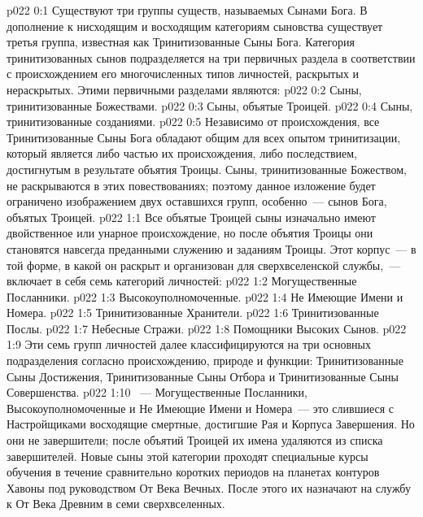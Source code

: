 \author{Могущественный Посланник}
\vs p022 0:1 Существуют три группы существ, называемых Сынами Бога. В дополнение к нисходящим и восходящим категориям сыновства существует третья группа, известная как Тринитизованные Сыны Бога. Категория тринитизованных сынов подразделяется на три первичных раздела в соответствии с происхождением его многочисленных типов личностей, раскрытых и нераскрытых. Этими первичными разделами являются:
\vs p022 0:2 Сыны, тринитизованные Божествами.
\vs p022 0:3 Сыны, объятые Троицей.
\vs p022 0:4 Сыны, тринитизованные созданиями.
\vs p022 0:5 Независимо от происхождения, все Тринитизованные Сыны Бога обладают общим для всех опытом тринитизации, который является либо частью их происхождения, либо последствием, достигнутым в результате объятия Троицы. Сыны, тринитизованные Божеством, не раскрываются в этих повествованиях; поэтому данное изложение будет ограничено изображением двух оставшихся групп, особенно~--- сынов Бога, объятых Троицей.
\vs p022 1:1 Все объятые Троицей сыны изначально имеют двойственное или унарное происхождение, но после объятия Троицы они становятся навсегда преданными служению и заданиям Троицы. Этот корпус~--- в той форме, в какой он раскрыт и организован для сверхвселенской службы,~--- включает в себя семь категорий личностей:
\vs p022 1:2 Могущественные Посланники.
\vs p022 1:3 Высокоуполномоченные.
\vs p022 1:4 Не Имеющие Имени и Номера.
\vs p022 1:5 Тринитизованные Хранители.
\vs p022 1:6 Тринитизованные Послы.
\vs p022 1:7 Небесные Стражи.
\vs p022 1:8 Помощники Высоких Сынов.
\vs p022 1:9 \pc Эти семь групп личностей далее классифицируются на три основных подразделения согласно происхождению, природе и функции: Тринитизованные Сыны Достижения, Тринитизованные Сыны Отбора и Тринитизованные Сыны Совершенства.
\vs p022 1:10 \pc {}~--- Могущественные Посланники, Высокоуполномоченные и Не Имеющие Имени и Номера~--- это слившиеся с Настройщиками восходящие смертные, достигшие Рая и Корпуса Завершения. Но они не завершители; после объятий Троицей их имена удаляются из списка завершителей. Новые сыны этой категории проходят специальные курсы обучения в течение сравнительно коротких периодов на планетах контуров Хавоны под руководством От Века Вечных. После этого их назначают на службу к От Века Древним в семи сверхвселенных.
